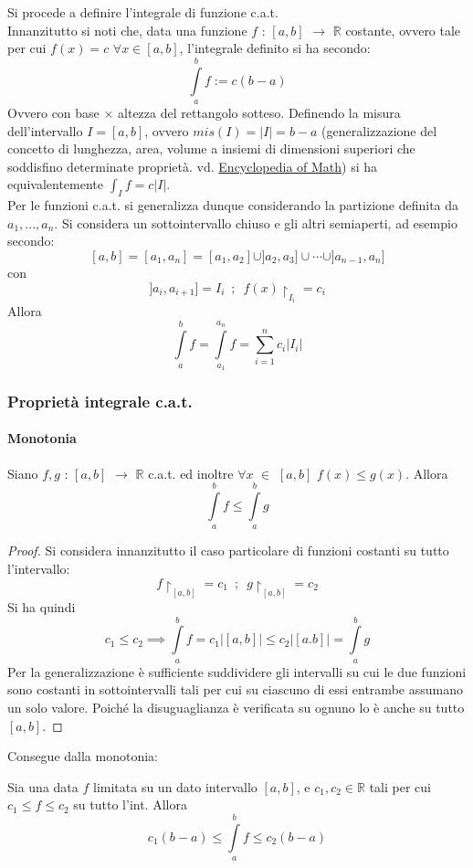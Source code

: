 \documentclass[10pt]{article}
\theoremstyle{plain}
\begin{document}
Si procede a definire l'integrale di funzione c.a.t.
\\Innanzitutto si noti che, data una funzione $f$ : $[a,b]$ $\rightarrow$ $\mathbb{R}$ costante, ovvero tale per cui $f(x) = c$ $\forall x \in [a,b]$, l'integrale definito si ha secondo:
\[\int \limits_a^b f := c (b - a)\]
Ovvero con base $\times$ altezza del rettangolo sotteso. Definendo la misura dell'intervallo $I = [a,b]$, ovvero $mis(I) = \big|I\big| = b - a$ (generalizzazione del concetto di lunghezza, area, volume a insiemi di dimensioni superiori che soddisfino determinate proprietà. vd. \href{https://encyclopediaofmath.org/wiki/Measure#Jordan.2C_Lebesgue_and_Lebesgue.E2.80.93Stieltjes_measures.}{Encyclopedia of Math}) si ha equivalentemente $\int_I f = c \big|I\big|$.
\\Per le funzioni c.a.t. si generalizza dunque considerando la partizione definita da $a_1, ..., a_n$. Si considera un sottointervallo chiuso e gli altri semiaperti, ad esempio secondo:
\[[a, b] = [a_1, a_n] = [a_1, a_2] \cup ]a_2, a_3] \cup \cdots \cup ]a_{n-1}, a_n]\]
con 
\[]a_i, a_{i+1}] = I_i \enspace; \enspace f(x)\restriction_{I_i} = c_i\]
Allora
\[\int\limits_{a}^{b} f = \int \limits_{a_1}^{a_n} f = \sum \limits_{i = 1}^n c_i \big|I_i\big|\]

\subsubsection{Proprietà integrale c.a.t.}
\paragraph{Monotonia}
Siano $f,g$ : $[a,b]$ $\rightarrow$ $\mathbb{R}$ c.a.t. ed inoltre $\forall x$ $\in$ $[a,b]$ $f(x) \leq g(x)$. Allora
\[\int\limits_{a}^{b} f \leq \int\limits_{a}^{b} g\]
\begin{proof}
    Si considera innanzitutto il caso particolare di funzioni costanti su tutto l'intervallo:
    \[f \restriction_{[a,b]} = c_1 \enspace ; \enspace g \restriction_{[a,b]} = c_2\]
    Si ha quindi
    \[c_1 \leq c_2 \implies \int\limits_{a}^{b} f = c_1|[a,b]| \leq c_2|[a.b]| = \int\limits_{a}^{b} g\]
    Per la generalizzazione è sufficiente suddividere gli intervalli su cui le due funzioni sono costanti in sottointervalli tali per cui su ciascuno di essi entrambe assumano un solo valore. Poiché la disuguaglianza è verificata su ognuno lo è anche su tutto $[a,b]$.
\end{proof}
Consegue dalla monotonia:
\begin{oss}
    Sia una data $f$ limitata su un dato intervallo $[a,b]$, e $c_1, c_2 \in \mathbb{R}$ tali per cui $c_1 \leq f \leq c_2$ su tutto l'int. Allora
    \[c_1(b - a) \leq \int\limits_{a}^{b} f \leq c_2(b-a)\]
\end{oss}
\end{document}
